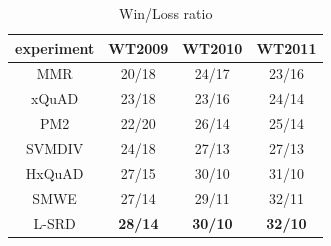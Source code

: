 \documentclass[review]{elsarticle}
\begin{document}
%

\begin{table}[!htb]
\centering
\begin{tabular}{|c|c|c|c|}
\hline
experiment & WT2009         & WT2010         & WT2011         \\
\hline
MMR        & 20/18          & 24/17          & 23/16          \\
xQuAD      & 23/18          & 23/16          & 24/14          \\
PM2        & 22/20          & 26/14          & 25/14          \\
SVMDIV     & 24/18          & 27/13          & 27/13          \\
HxQuAD     & 27/15          & 30/10          & 31/10          \\
SMWE       & 27/14          & 29/11          & 32/11          \\
L-SRD      & \textbf{28/14} & \textbf{30/10} & \textbf{32/10}  \\
\hline
\end{tabular}
\caption{Win/Loss ratio}
\label{tab3}
\end{table}
\end{document}
